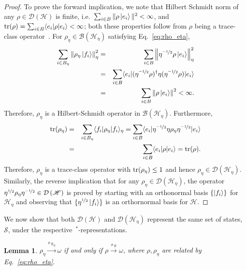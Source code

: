 \documentclass[amsmath,amssymb,aps,pra,superscriptaddress,twocolumn]{revtex4-2}
\newtheorem{lemma}[theorem]{Lemma}
\begin{document}
\begin{appendix}
\begin{proof}
To prove the forward implication, we note that Hilbert Schmidt norm of any $\rho \in\mathcal{D}\left(\mathscr{H}\right)$
is finite, i.e.\ $\sum_{i\in B}\|\rho\ket{e_i}\|^2<\infty$, and
${\rm tr}(\rho) = \sum_{i\in B} \langle e_i|\rho |e_i\rangle<\infty$; 
both these properties follow from $\rho$ being a trace-class operator~\cite{Con07}.
For $\rho_\eta\in\mathcal{B}(\mathscr{H}_\eta)$ satisfying Eq.~\eqref{eq:rho_eta}, 
\begin{eqnarray}
    \sum_{i\in B_\eta}\left\|\rho_\eta\ket{f_i}\right\|_\eta^2 &=& 
    \sum_{i\in B}\left\|\eta^{\nicefrac{-1}{2}}\rho\ket{e_i}\right\|_\eta^2 \nonumber\\ 
    &=& \sum_{i\in B}\langle e_i| (\eta^{\nicefrac{-1}{2}}\rho)^\dagger \eta (\eta^{\nicefrac{-1}{2}}\rho)|e_i\rangle \nonumber\\
    &=& \sum_{i\in B}\left\|\rho\ket{e_i}\right\|^2 <\infty.
\end{eqnarray}
Therefore, $\rho_\eta$ is a Hilbert-Schmidt operator in $\mathcal{B}(\mathscr{H}_\eta)$. 
Furthermore, 
\begin{eqnarray}\label{eq:rho_etatrace}
    {\rm tr}(\rho_\eta) &=& \sum_{i\in B_\eta}\langle f_i|\rho_\eta|f_i\rangle_\eta 
 = \sum_{i\in B}\langle e_i|\eta^{\nicefrac{-1}{2}}\eta \rho_\eta\eta^{\nicefrac{-1}{2}}|e_i\rangle \nonumber\\
   & =& \sum_{i\in B}\langle e_i| \rho|e_i\rangle  = {\rm tr}(\rho).
\end{eqnarray}
Therefore,  $\rho_\eta$ is a trace-class operator with $ {\rm tr}(\rho_\eta)\leq 1$ and hence $\rho_\eta \in\mathcal{D}\left(\mathscr{H}_\eta\right) $.
Similarly, the reverse implication that for any $\rho_\eta \in\mathcal{D}\left(\mathscr{H}_\eta\right) $, the operator
$\eta^{\nicefrac{1}{2}}\rho_\eta \eta^{\nicefrac{-1}{2}} \in \mathcal{D}\left(\mathscr{H}\right)$ is proved by 
starting with an orthonormal basis $\{\ket{f_i}\}$ for $\mathscr{H}_\eta$ and observing that 
$\{\eta^{\nicefrac{1}{2}}\ket{f_i}\}$ is an orthornormal basis for $\mathscr{H}$.

\end{proof}

We now show that both $\mathcal{D}(\mathscr{H})$ and  $\mathcal{D}(\mathscr{H}_\eta)$ represent the same set of states, $\mathcal{S}$,
under the respective~$^*$-representations.
\begin{lemma}
    $\rho_\eta\stackrel{\!\!{}^{\#}\!\pi_\eta}{\to} \omega$ if and only if $\rho\stackrel{\!\!{}^{\#}\!\pi}{\to} \omega$, where $\rho,\rho_\eta$
are related by Eq.~\eqref{eq:rho_eta}.


\end{lemma}
\end{appendix}
\end{document}

